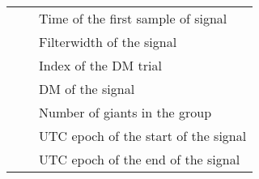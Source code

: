 \begin{table}[]
\begin{tabular}{lll}
																																																									&                                                            & Time of the first sample of signal                                                                                   \\
																																																									&                                                            & Filterwidth of the signal                                                                                            \\
																																																									&                                                            & Index of the DM trial                                                                                                \\
																																																									&                                                            & DM of the signal                                                                                                     \\
																																																									&                                                            & Number of giants in the group                                                                                        \\
																																																									&                                                            & UTC epoch of the start of the signal                                                                                 \\
																																																									&                                                            & UTC epoch of the end of the signal                                                                                  
										 
 \end{tabular}
\end{table}
